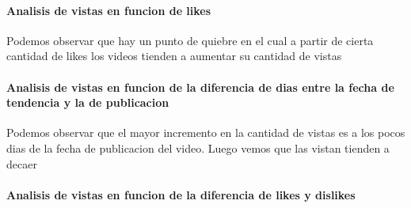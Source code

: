         \paragraph{Analisis de vistas en funcion de likes}
            \begin{figure}[ht]
            \end{figure}
        \FloatBarrier
        Podemos observar que hay un punto de quiebre en el cual a partir de
        cierta cantidad de likes los videos tienden a aumentar su cantidad
        de vistas
        \newpage

        \paragraph{Analisis de vistas en funcion de la diferencia de dias entre la fecha de tendencia y la de publicacion}

            \begin{figure}[ht]
            \end{figure}
        \FloatBarrier
        Podemos observar que el mayor incremento en la cantidad de vistas es a
        los pocos dias de la fecha de publicacion del video. Luego vemos que
        las vistan tienden a decaer
        \newpage

        \paragraph{Analisis de vistas en funcion de la diferencia de likes y dislikes}

